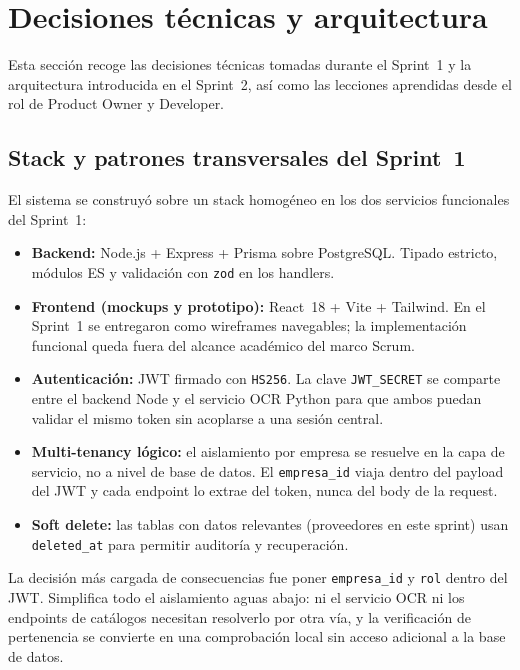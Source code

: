 
\section{Decisiones técnicas y arquitectura}
\label{sec:decisiones-tecnicas}

Esta sección recoge las decisiones técnicas tomadas durante el Sprint~1 y la arquitectura introducida en el Sprint~2, así como las lecciones aprendidas desde el rol de Product Owner y Developer.

\subsection{Stack y patrones transversales del Sprint~1}

El sistema se construyó sobre un stack homogéneo en los dos servicios funcionales del Sprint~1:

\begin{itemize}
\item \textbf{Backend:} Node.js + Express + Prisma sobre PostgreSQL. Tipado estricto, módulos ES y validación con \texttt{zod} en los handlers.
\item \textbf{Frontend (mockups y prototipo):} React~18 + Vite + Tailwind. En el Sprint~1 se entregaron como wireframes navegables; la implementación funcional queda fuera del alcance académico del marco Scrum.
\item \textbf{Autenticación:} JWT firmado con \texttt{HS256}. La clave \texttt{JWT\_SECRET} se comparte entre el backend Node y el servicio OCR Python para que ambos puedan validar el mismo token sin acoplarse a una sesión central.
\item \textbf{Multi-tenancy lógico:} el aislamiento por empresa se resuelve en la capa de servicio, no a nivel de base de datos. El \texttt{empresa\_id} viaja dentro del payload del JWT y cada endpoint lo extrae del token, nunca del body de la request.
\item \textbf{Soft delete:} las tablas con datos relevantes (proveedores en este sprint) usan \texttt{deleted\_at} para permitir auditoría y recuperación.
\end{itemize}

La decisión más cargada de consecuencias fue poner \texttt{empresa\_id} y \texttt{rol} dentro del JWT. Simplifica todo el aislamiento aguas abajo: ni el servicio OCR ni los endpoints de catálogos necesitan resolverlo por otra vía, y la verificación de pertenencia se convierte en una comprobación local sin acceso adicional a la base de datos.

